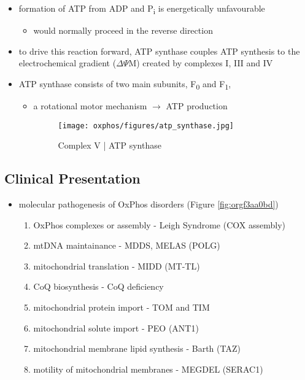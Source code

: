 \documentclass{scrartcl}
\begin{document}
{\small{}}

\begin{itemize}
\item formation of ATP from ADP and P\textsubscript{i} is energetically unfavourable
\begin{itemize}
\item would normally proceed in the reverse direction
\end{itemize}

\item to drive this reaction forward, ATP synthase couples ATP synthesis
to the electrochemical gradient (\(\Delta \Psi\)M) created by complexes
I, III and IV
\item ATP synthase consists of two main subunits, F\textsubscript{0} and F\textsubscript{1},
\begin{itemize}
\item a rotational motor mechanism \(\to\) ATP production

\begin{figure}[htbp]
\centering
\texttt{[image: oxphos/figures/atp\_synthase.jpg]}
\caption{\label{fig:orgdf7f599}Complex V | ATP synthase}
\end{figure}
\end{itemize}
\end{itemize}

\subsection{Clinical Presentation}
\label{sec:orgee1b64e}
\begin{itemize}
\item molecular pathogenesis of OxPhos disorders (Figure \ref{fig:orgf3aa0bd})
\begin{enumerate}
\item OxPhos complexes or assembly - Leigh Syndrome (COX assembly)
\item mtDNA maintainance - MDDS, MELAS (POLG)
\item mitochondrial translation - MIDD (MT-TL)
\item CoQ biosynthesis - CoQ deficiency
\item mitochondrial protein import - TOM and TIM
\item mitochondrial solute import - PEO (ANT1)
\item mitochondrial membrane lipid synthesis - Barth (TAZ)
\item motility of mitochondrial membranes - MEGDEL (SERAC1)
\end{enumerate}
\end{itemize}
\end{document}
